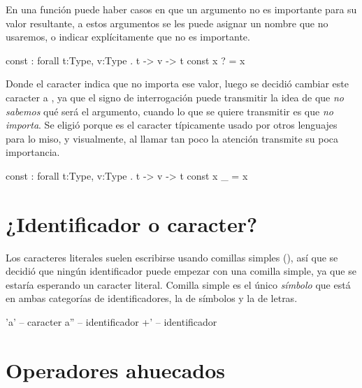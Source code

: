 \begin{blueleft}
En una función puede haber casos en que un argumento no es importante para su valor resultante, a estos argumentos se les puede asignar un nombre que no usaremos, o indicar explícitamente que no es importante.

\begin{anglercode}
const : forall t:Type, v:Type . t -> v -> t
const x ? = x
\end{anglercode}

Donde el caracter  indica que no importa ese valor, luego se decidió cambiar este caracter a \inlinecode{\_}, ya que el signo de interrogación puede transmitir la idea de que \emph{no sabemos} qué será el argumento, cuando lo que se quiere transmitir es que \emph{no importa}. Se eligió \inlinecode{\_} porque es el caracter típicamente usado por otros lenguajes para lo miso, y visualmente, al llamar tan poco la atención transmite su poca importancia.

\begin{anglercode}
const : forall t:Type, v:Type . t -> v -> t
const x _ = x
\end{anglercode}
\end{blueleft}

\section{¿Identificador o caracter?}

\begin{blueleft}
Los caracteres literales suelen escribirse usando comillas simples (), así que se decidió que ningún identificador puede empezar con una comilla simple, ya que se estaría esperando un caracter literal. Comilla simple es el único \emph{símbolo} que está en ambas categorías de identificadores, la de símbolos y la de letras.

\begin{anglercode}
'a'     -- caracter
a''     -- identificador
+'      -- identificador
\end{anglercode}
\end{blueleft}

\section{Operadores ahuecados}

